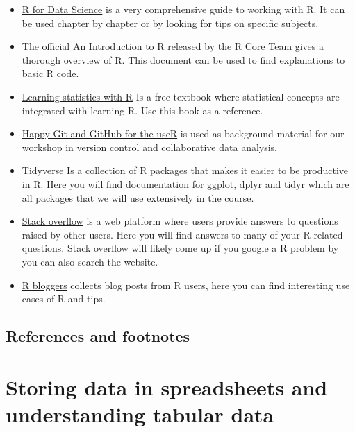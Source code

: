 \documentclass[
  11pt,
  letterpaper,
]{scrbook}
\begin{document}
\begin{itemize}
\item
  \href{https://r4ds.hadley.nz/}{R for Data Science} is a very
  comprehensive guide to working with R. It can be used chapter by
  chapter or by looking for tips on specific subjects.
\item
  The official
  \href{https://cran.r-project.org/doc/manuals/R-intro.pdf}{An
  Introduction to R} released by the R Core Team gives a thorough
  overview of R. This document can be used to find explanations to basic
  R code.
\item
  \href{https://learningstatisticswithr.com/}{Learning statistics with
  R} Is a free textbook where statistical concepts are integrated with
  learning R. Use this book as a reference.
\item
  \href{https://happygitwithr.com/index.html}{Happy Git and GitHub for
  the useR} is used as background material for our workshop in version
  control and collaborative data analysis.
\item
  \href{https://www.tidyverse.org/}{Tidyverse} Is a collection of R
  packages that makes it easier to be productive in R. Here you will
  find documentation for ggplot, dplyr and tidyr which are all packages
  that we will use extensively in the course.
\item
  \href{https://stackoverflow.com/}{Stack overflow} is a web platform
  where users provide answers to questions raised by other users. Here
  you will find answers to many of your R-related questions. Stack
  overflow will likely come up if you google a R problem by you can also
  search the website.
\item
  \href{https://www.r-bloggers.com/}{R bloggers} collects blog posts
  from R users, here you can find interesting use cases of R and tips.
\end{itemize}

\hypertarget{references-and-footnotes}{%
\section{References and footnotes}\label{references-and-footnotes}}


\hypertarget{storing-data-in-spreadsheets-and-understanding-tabular-data}{%
\chapter{Storing data in spreadsheets and understanding tabular
data}\label{storing-data-in-spreadsheets-and-understanding-tabular-data}}
\end{document}
